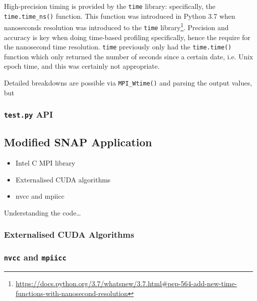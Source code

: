 \documentclass[conference]{IEEEtran}
\begin{document}
High-precision timing is provided by the \texttt{time} library: specifically, the \texttt{time.time\_ns()} function. This function was introduced in Python 3.7 when nanoseconds resolution was introduced to the \texttt{time} library\footnote{\url{https://docs.python.org/3.7/whatsnew/3.7.html#pep-564-add-new-time-functions-with-nanosecond-resolution}}. Precision and accuracy is key when doing time-based profiling specifically, hence the require for the nanosecond time resolution. \texttt{time} previously only had the \texttt{time.time()} function which only returned the number of seconds since a certain date, i.e. Unix epoch time, and this was certainly not appropriate.

Detailed breakdowns are possible via \texttt{MPI\_Wtime()} and parsing the output values, but



\subsubsection{\texttt{test.py} API}
\label{subsubsec:testapi}


\subsection{Modified SNAP Application}
\label{subsec:imp_mod_snap}

\begin{itemize}
    \item Intel C MPI library
    \item Externalised CUDA algorithms
    \item nvcc and mpiicc
\end{itemize}

Understanding the code\dots

\subsubsection{Externalised CUDA Algorithms}

\subsubsection{\texttt{nvcc} and \texttt{mpiicc}}

\end{document}
